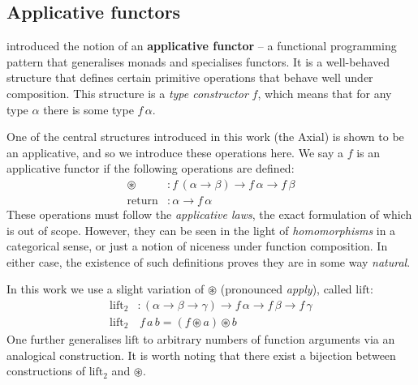 \subsection{Applicative functors}

\textcite{mcbride2008applicative} introduced the notion of an \textbf{applicative functor} -- a functional programming pattern that generalises monads and specialises functors. It is a well-behaved structure that defines certain primitive operations that behave well under composition. This structure is a \textit{type constructor} $f$, which means that for any type $\alpha$ there is some type $f\,\alpha$.

One of the central structures introduced in this work (the Axial) is shown to be an applicative, and so we introduce these operations here. We say a $f$ is an applicative functor if the following operations are defined:
\begin{align*}
\circledast &: f\,(\alpha \to \beta) \to f\,\alpha \to f\,\beta \\
\mathrm{return} &: \alpha \to f\,\alpha
\end{align*}
These operations must follow the \textit{applicative laws}, the exact formulation of which is out of scope. However, they can be seen in the light of \textit{homomorphisms} in a categorical sense, or just a notion of niceness under function composition. In either case, the existence of such definitions proves they are in some way \textit{natural}. 

In this work we use a slight variation of $\circledast$ (pronounced \textit{apply}), called $\mathrm{lift}$:
\begin{align*}
\mathrm{lift}_2& : (\alpha \to \beta \to \gamma) \to f\,\alpha \to f\,\beta \to f\,\gamma \\ 
\mathrm{lift}_2&\,f\,a\,b = (f \circledast a) \circledast b
\end{align*}
One further generalises $\mathrm{lift}$ to arbitrary numbers of function arguments via an analogical construction. It is worth noting that there exist a bijection between constructions of $\mathrm{lift}_2$ and $\circledast$.

